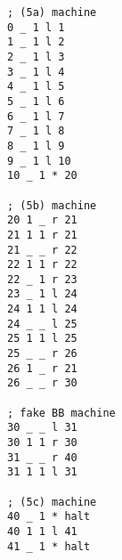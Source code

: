 \begin{verbatim}
; (5a) machine
0 _ 1 l 1 
1 _ 1 l 2 
2 _ 1 l 3
3 _ 1 l 4 
4 _ 1 l 5 
5 _ 1 l 6 
6 _ 1 l 7 
7 _ 1 l 8 
8 _ 1 l 9 
9 _ 1 l 10 
10 _ 1 * 20 

; (5b) machine
20 1 _ r 21 
21 1 1 r 21
21 _ _ r 22
22 1 1 r 22
22 _ 1 r 23
23 _ 1 l 24
24 1 1 l 24
24 _ _ l 25
25 1 1 l 25
25 _ _ r 26
26 1 _ r 21
26 _ _ r 30

; fake BB machine
30 _ _ l 31 
30 1 1 r 30
31 _ _ r 40
31 1 1 l 31

; (5c) machine
40 _ 1 * halt 
40 1 1 l 41
41 _ 1 * halt
\end{verbatim}